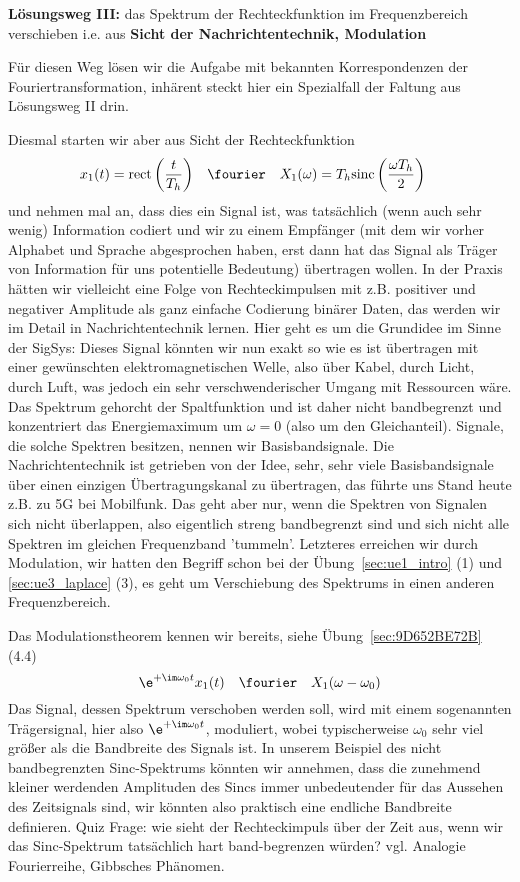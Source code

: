 \begin{ExCalc}
\textbf{Lösungsweg III:}
das Spektrum der Rechteckfunktion im Frequenzbereich verschieben
i.e. aus \textbf{Sicht der Nachrichtentechnik, Modulation}

Für diesen Weg lösen wir die Aufgabe mit bekannten Korrespondenzen der
Fouriertransformation, inhärent steckt hier ein Spezialfall der Faltung aus
Lösungsweg II drin.

Diesmal starten wir aber aus Sicht der Rechteckfunktion
\begin{align}
x_1(t) = \mathrm{rect}\left(\frac{t}{T_h}\right) &\quad \fourier \quad X_1(\omega) = T_h \mathrm{sinc}\left(\frac{\omega T_h}{2}\right)
\end{align}
und nehmen mal an, dass dies ein Signal ist, was tatsächlich (wenn auch sehr wenig)
Information codiert und wir zu einem Empfänger (mit dem wir vorher
Alphabet und Sprache abgesprochen haben,
erst dann hat das Signal als Träger von Information
für uns potentielle Bedeutung) übertragen wollen.
In der Praxis hätten wir vielleicht eine Folge von Rechteckimpulsen
mit z.B. positiver und negativer Amplitude als ganz einfache Codierung binärer
Daten, das werden wir im Detail in Nachrichtentechnik lernen. Hier geht es um die
Grundidee im Sinne der SigSys: Dieses Signal könnten wir nun exakt so wie es ist
übertragen mit einer gewünschten elektromagnetischen Welle, also über Kabel, durch Licht,
durch Luft, was jedoch ein sehr verschwenderischer Umgang mit Ressourcen wäre.
Das Spektrum gehorcht der Spaltfunktion und ist daher nicht bandbegrenzt und
konzentriert das Energiemaximum um $\omega=0$ (also um den Gleichanteil). Signale,
die solche Spektren besitzen, nennen wir Basisbandsignale.
Die Nachrichtentechnik ist getrieben von der Idee, sehr, sehr viele Basisbandsignale
über einen einzigen Übertragungskanal zu übertragen, das führte uns Stand heute
z.B. zu 5G bei Mobilfunk. Das geht aber nur, wenn die Spektren von
Signalen sich nicht überlappen, also eigentlich streng bandbegrenzt sind
und sich nicht alle Spektren im gleichen Frequenzband 'tummeln'.
Letzteres erreichen wir durch Modulation, wir hatten den Begriff schon bei der Übung~\ref{sec:ue1_intro} (1) und \ref{sec:ue3_laplace} (3),
es geht um Verschiebung des Spektrums in einen anderen Frequenzbereich.

Das Modulationstheorem kennen wir bereits, siehe Übung~\ref{sec:9D652BE72B} (4.4)
\begin{equation}
  \e^{+\im\omega_0 t} x_1(t) \quad\fourier\quad X_1(\omega-\omega_0)
\end{equation}
Das Signal, dessen Spektrum verschoben werden soll, wird mit einem sogenannten Trägersignal,
hier also $\e^{+\im\omega_0 t}$, moduliert, wobei typischerweise $\omega_0$ sehr viel größer als
die Bandbreite des Signals ist. In unserem Beispiel des nicht bandbegrenzten Sinc-Spektrums
könnten wir annehmen, dass die zunehmend kleiner werdenden Amplituden des Sincs
immer unbedeutender für das Aussehen des Zeitsignals sind, wir könnten also praktisch eine
endliche Bandbreite definieren. Quiz Frage: wie sieht der Rechteckimpuls über der Zeit aus, wenn
wir das Sinc-Spektrum tatsächlich hart band-begrenzen würden? vgl. Analogie Fourierreihe, Gibbsches Phänomen.


\end{ExCalc}
